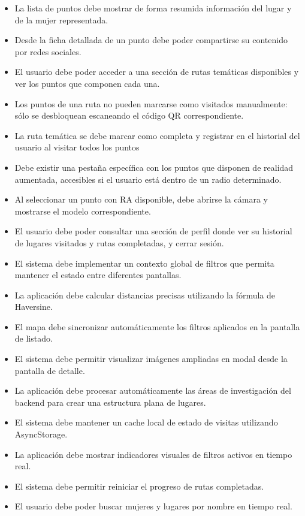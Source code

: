 \begin{itemize}
\item[RF35:] La lista de puntos debe mostrar de forma resumida información del lugar y de la mujer representada.
\item[RF36:] Desde la ficha detallada de un punto debe poder compartirse su contenido por redes sociales.
\item[RF37:] El usuario debe poder acceder a una sección de rutas temáticas disponibles y ver los puntos que componen cada una.
\item[RF38:] Los puntos de una ruta no pueden marcarse como visitados manualmente: sólo se desbloquean escaneando el código QR correspondiente.
\item[RF39:] La ruta temática se debe marcar como completa y registrar en el historial del usuario al visitar todos los puntos
\item[RF40:] Debe existir una pestaña específica con los puntos que disponen de realidad aumentada, accesibles si el usuario está dentro de un radio determinado.
\item[RF41:] Al seleccionar un punto con RA disponible, debe abrirse la cámara y mostrarse el modelo correspondiente.
\item[RF42:] El usuario debe poder consultar una sección de perfil donde ver su historial de lugares visitados y rutas completadas, y cerrar sesión.
\item[RF43:] El sistema debe implementar un contexto global de filtros que permita mantener el estado entre diferentes pantallas.
\item[RF44:] La aplicación debe calcular distancias precisas utilizando la fórmula de Haversine\cite{viafirmaHaversine}.
\item[RF45:] El mapa debe sincronizar automáticamente los filtros aplicados en la pantalla de listado.
\item[RF46:] El sistema debe permitir visualizar imágenes ampliadas en modal desde la pantalla de detalle.
\item[RF47:] La aplicación debe procesar automáticamente las áreas de investigación del backend para crear una estructura plana de lugares.
\item[RF48:] El sistema debe mantener un cache local de estado de visitas utilizando AsyncStorage.
\item[RF49:] La aplicación debe mostrar indicadores visuales de filtros activos en tiempo real.
\item[RF50:] El sistema debe permitir reiniciar el progreso de rutas completadas.
\item[RF51:] El usuario debe poder buscar mujeres y lugares por nombre en tiempo real.
\end{itemize}

